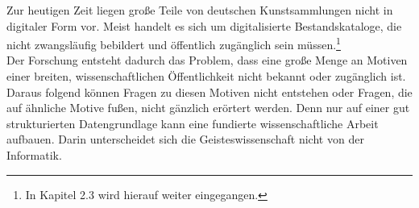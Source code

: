 \documentclass[a4paper,12pt,ngerman]{article}
\begin{document}
Zur heutigen Zeit liegen große Teile von deutschen Kunstsammlungen nicht in digitaler Form vor. Meist handelt es sich um digitalisierte Bestandskataloge, die nicht zwangsläufig bebildert und öffentlich zugänglich sein müssen.\footnote{In Kapitel 2.3 wird hierauf weiter eingegangen.} \\
Der Forschung entsteht dadurch das Problem, dass eine große Menge an Motiven einer breiten, wissenschaftlichen Öffentlichkeit nicht bekannt oder zugänglich ist. Daraus folgend können Fragen zu diesen Motiven nicht entstehen oder Fragen, die auf ähnliche Motive fußen, nicht gänzlich erörtert werden. Denn nur auf einer gut strukturierten Datengrundlage kann eine fundierte wissenschaftliche Arbeit aufbauen. Darin unterscheidet sich die Geisteswissenschaft nicht von der Informatik. \\
\end{document}
